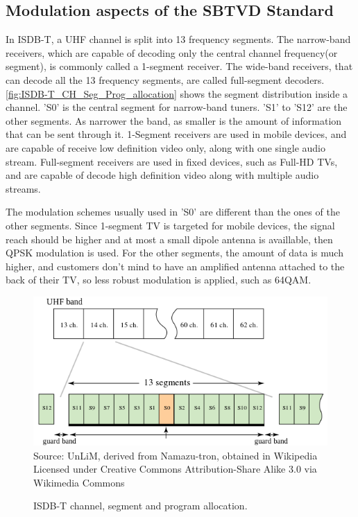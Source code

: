 \documentclass[
	12pt,				%
	openright,			%
	twoside,			%
	a4paper,			%
	brazil,
	french,				%
	english
	]{abntex2}
\begin{document}
\begin{apendicesenv}

\partapendices

\chapter{Modulation aspects of the SBTVD Standard}
\label{modulation}
In ISDB-T, a UHF channel is split into 13 frequency segments. The narrow-band receivers, which are capable of decoding only the central channel frequency(or segment), is commonly called a 1-segment receiver. The wide-band receivers, that can decode all the 13 frequency segments, are called full-segment decoders. \autoref{fig:ISDB-T_CH_Seg_Prog_allocation} shows the segment distribution inside a channel. 'S0' is the central segment for narrow-band tuners. 'S1' to 'S12' are the other segments. As narrower the band, as smaller is the amount of information that can be sent through it. 1-Segment receivers are used in mobile devices, and are capable of receive low definition video only, along with one single audio stream. Full-segment receivers are used in fixed devices, such as Full-HD TVs, and are capable of decode high definition video along with multiple audio streams.

The modulation schemes usually used in 'S0' are different than the ones of the other segments. Since 1-segment TV is targeted for mobile devices, the signal reach should be higher and at most a small dipole antenna is availlable, then QPSK modulation is used. For the other segments, the amount of data is much higher, and customers don't mind to have an amplified antenna attached to the back of their TV, so less robust modulation is applied, such as 64QAM. 

\begin{figure}
\centering
\caption{ISDB-T channel, segment and program allocation.}
\includegraphics[width=0.8\linewidth]{figuras/ISDB-T_CH_Seg_Prog_allocation.png}
\\ Source: UnLiM, derived from Namazu-tron, obtained in Wikipedia \cite{ISDB_wiki}
\\ Licensed under Creative Commons Attribution-Share Alike 3.0 via Wikimedia Commons
\label{fig:ISDB-T_CH_Seg_Prog_allocation}
\end{figure}


\end{apendicesenv}
\end{document}

